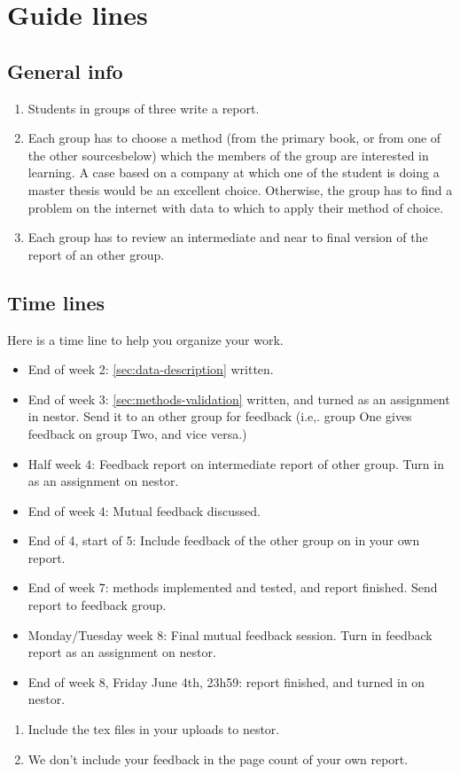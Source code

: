 \documentclass[report]{subfiles}
\begin{document}
\section*{Guide lines}
\label{sec:time-line}

\subsection*{General info}
\label{sec:general}


\begin{enumerate}
\item  Students in groups of three write a report.
\item Each group has to choose a method (from the primary book, or from one of the other sourcesbelow) which the members of the group are interested in learning. A case based on a company at which one of the student is doing a master thesis would be an excellent choice.
Otherwise, the group has to find a problem on the internet with data to which to apply their method of choice.
\item Each group has to review an intermediate and near to final version of the report of an other group.
\end{enumerate}

\subsection*{Time lines}


Here is a time line to help you organize your work.

\begin{itemize}
\item End of week 2: \cref{sec:data-description} written.
\item End of week 3: \cref{sec:methods-validation} written, and turned as an assignment in nestor.
  Send it to an other group for feedback (i.e,.
  group One gives feedback on group Two, and vice versa.)
\item Half week 4: Feedback report on intermediate report of other  group. Turn in  as an assignment on nestor.
\item End of week 4:   Mutual feedback discussed.
\item End of 4, start of 5: Include feedback of the other group on in your own report.
\item End of week 7: methods implemented and tested, and report finished. Send report to feedback group.
\item Monday/Tuesday week 8: Final mutual feedback session. Turn in feedback  report as an assignment on nestor.
\item End of week 8, Friday June 4th, 23h59: report finished, and turned in on nestor.
\end{itemize}

\begin{enumerate}
\item Include the tex files in your uploads to nestor.
\item  We don't include your feedback in the page count of your own report.
\end{enumerate}
\end{document}

